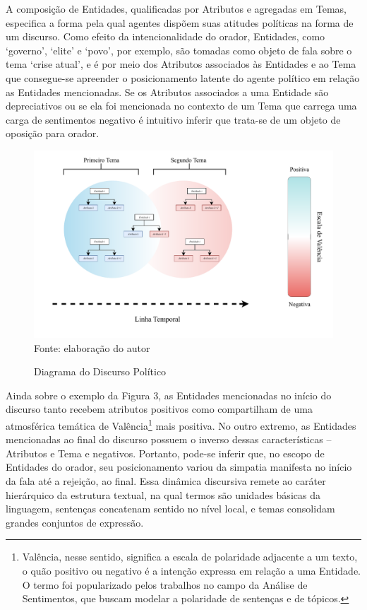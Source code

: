 \documentclass[
12pt,				%
openright,			%
twoside,			%
a4paper,			%
english,			%
french,				%
spanish,			%
brazil				%
]{abntex2}
\begin{document}
A composição de Entidades, qualificadas por Atributos e agregadas em Temas, especifica a forma pela qual agentes dispõem suas atitudes políticas na forma de um discurso. Como efeito da intencionalidade do orador, Entidades, como `governo', `elite' e `povo', por exemplo, são tomadas como objeto de fala sobre o tema `crise atual', e é por meio dos Atributos associados às Entidades e ao Tema que consegue-se apreender o posicionamento latente do agente político em relação as Entidades mencionadas. Se os Atributos associados a uma Entidade são depreciativos ou se ela foi mencionada no contexto de um Tema que carrega uma carga de sentimentos negativo é intuitivo inferir que trata-se de um objeto de oposição para orador.

\begin{figure}[h]
	\caption{Diagrama do Discurso Político}
	\label{fig:discourse_representation}
	\centering
	\includegraphics[width=1\linewidth]{figures/diagrama_discurso_autoritario}
	Fonte: elaboração do autor
\end{figure}

Ainda sobre o exemplo da Figura 3, as Entidades mencionadas no início do discurso tanto recebem atributos positivos como compartilham de uma atmosférica temática de Valência\footnote{Valência, nesse sentido, significa a escala de polaridade adjacente a um texto, o quão positivo ou negativo é a intenção expressa em relação a uma Entidade. O termo foi popularizado pelos trabalhos no campo da Análise de Sentimentos, que buscam modelar a polaridade de sentenças e de tópicos.} mais positiva. No outro extremo, as Entidades mencionadas ao final do discurso possuem o inverso dessas características -- Atributos e Tema e negativos. Portanto, pode-se inferir que, no escopo de Entidades do orador, seu posicionamento variou da simpatia manifesta no início da fala até a rejeição, ao final. Essa dinâmica discursiva remete ao caráter hierárquico da estrutura textual, na qual termos são unidades básicas da linguagem, sentenças concatenam sentido no nível local, e temas consolidam grandes conjuntos de expressão.    
\end{document}

